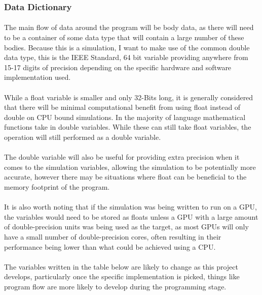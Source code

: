 \subsubsection{Data Dictionary}
\paragraph{}
The main flow of data around the program will be body data, as there will need to be a container of some data type that will contain a large number of these bodies. Because this is a simulation, I want to make use of the common double data type, this is the IEEE Standard, 64 bit variable providing anywhere from 15-17 digits of precision depending on the specific hardware and software implementation used.

\paragraph{} 
While a float variable is smaller and only 32-Bits long, it is generally considered that there will be minimal computational benefit from using float instead of double on CPU bound simulations. In the majority of language mathematical functions take in double variables. While these can still take float variables, the operation will still performed as a double variable.

\paragraph{}
The double variable will also be useful for providing extra precision when it comes to the simulation variables, allowing the simulation to be potentially more accurate, however there may be situations where float can be beneficial to the memory footprint of the program.

\paragraph{}
It is also worth noting that if the simulation was being written to run on a GPU, the variables would need to be stored as floats unless a GPU with a large amount of double-precision units was being used as the target, as most GPUs will only have a small number of double-precision cores, often resulting in their performance being lower than what could be achieved using a CPU.

\paragraph{}
The variables written in the table below are likely to change as this project develops, particularly once the specific implementation is picked, things like program flow are more likely to develop during the programming stage.

